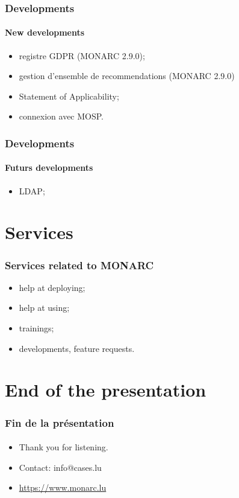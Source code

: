 \documentclass[]{beamer}
\begin{document}
\begin{frame}
    \frametitle{Developments}
    \framesubtitle{New developments}
    \begin{itemize}
        \item registre GDPR (MONARC 2.9.0);
        \item gestion d'ensemble de recommendations (MONARC 2.9.0)
        \item Statement of Applicability;
        \item connexion avec MOSP.
    \end{itemize}
\end{frame}

\begin{frame}
    \frametitle{Developments}
    \framesubtitle{Futurs developments}
    \begin{itemize}
        \item LDAP;
        
    \end{itemize}
\end{frame}










%
%
\section*{Services}
\begin{frame}
    \frametitle{Services related to MONARC}
    \begin{center}
        \begin{itemize}
            \item help at deploying;
            \item help at using;
            \item trainings;
            \item developments, feature requests.
        \end{itemize}
    \end{center}
\end{frame}





%
%
\section*{End of the presentation}
\begin{frame}
    \frametitle{Fin de la présentation}
    \framesubtitle{}
    \begin{center}
        \begin{itemize}
            \item Thank you for listening.
            \item Contact: info@cases.lu
            \item \url{https://www.monarc.lu}
        \end{itemize}
    \end{center}
\end{frame}
\end{document}
